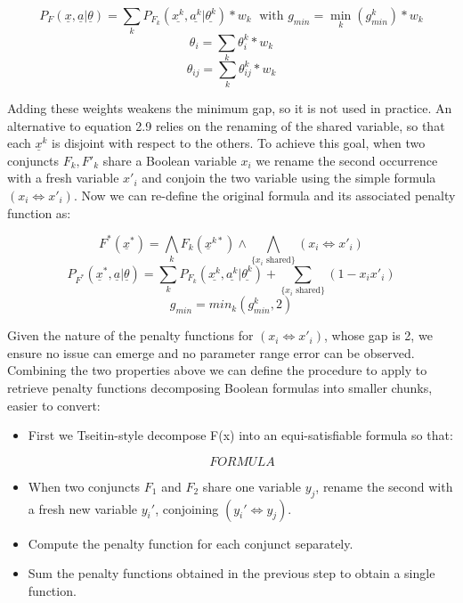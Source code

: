 \begin{equation*}
    P_{F}(\underline{x},\underline{a}|\underline{\theta}) = \sum_k P_{F_k}(\underline{x^k},\underline{a^k}|\underline{\theta^k})*w_k \; \textrm{        with        } g_{min} = \min_k(g^k_{min})*w_k
\end{equation*}
\begin{equation}
    \theta_i = \sum_k \theta^k_i*w_k
\end{equation}
\begin{equation*}
    \theta_{ij} = \sum_k \theta^k_{ij}*w_k
\end{equation*}

Adding these weights weakens the minimum gap, so it is not used in practice. An alternative to equation 2.9 relies on the renaming of the shared variable, so that each $\underline{x}^k$ is disjoint with respect to the others. To achieve this goal, when two conjuncts $F_k, F'_k$ share a Boolean variable $x_i$ we rename the second occurrence with a fresh variable $x'_i$ and conjoin the two variable using the simple formula $(x_i \iff x'_i)$. Now we can re-define the original formula and its associated penalty function as:

\begin{equation*}
    F^*(\underline{x}^*) = \bigwedge_k F_k(\underline{x}^{k*}) \land \bigwedge_{\{ x_i \textrm{  shared}\}} (x_i \iff x'_i) 
\end{equation*}
\begin{equation}
    P_{F^*}(\underline{x}^*,\underline{a}|\underline{\theta}) = \sum_k P_{F_k}(\underline{x^k},\underline{a^k}|\underline{\theta^k}) + \sum_{\{ x_i \textrm{  shared}\}} (1 - x_ix'_i)
\end{equation}
\begin{equation*}
    g_{min} = min_k(g^k_{min},2)
\end{equation*}

Given the nature of the penalty functions for $(x_i \iff x'_i)$, whose gap is 2, we ensure no issue can emerge and no parameter range error can be observed.
Combining the two properties above we can define the procedure to apply to retrieve penalty functions decomposing Boolean formulas into smaller chunks, easier to convert:

\begin{itemize}
    \item First we Tseitin-style decompose F(x) into an equi-satisfiable formula so that:
    
    \begin{equation}
        FORMULA
    \end{equation}
    \item When two conjuncts $F_1$ and $F_2$ share one variable $y_j$, rename the second with a fresh new variable $y_i'$, conjoining $(y_i' \iff y_j)$.
    \item Compute the penalty function for each conjunct separately.
    \item Sum the penalty functions obtained in the previous step to obtain a single function. 
\end{itemize}

